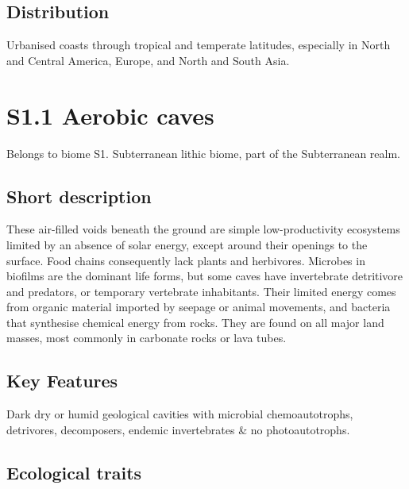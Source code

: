 \documentclass[
  letterpaper,
  DIV=11,
  numbers=noendperiod]{scrartcl}
\begin{document}
\subsection{Distribution}\label{distribution-58}

Urbanised coasts through tropical and temperate latitudes, especially in
North and Central America, Europe, and North and South Asia.

\section{S1.1 Aerobic caves}\label{s1.1-aerobic-caves}

Belongs to biome S1. Subterranean lithic biome, part of the Subterranean
realm.

\subsection{Short description}\label{short-description-59}

These air-filled voids beneath the ground are simple low-productivity
ecosystems limited by an absence of solar energy, except around their
openings to the surface. Food chains consequently lack plants and
herbivores. Microbes in biofilms are the dominant life forms, but some
caves have invertebrate detritivore and predators, or temporary
vertebrate inhabitants. Their limited energy comes from organic material
imported by seepage or animal movements, and bacteria that synthesise
chemical energy from rocks. They are found on all major land masses,
most commonly in carbonate rocks or lava tubes.

\subsection{Key Features}\label{key-features-59}

Dark dry or humid geological cavities with microbial chemoautotrophs,
detrivores, decomposers, endemic invertebrates \& no photoautotrophs.

\subsection{Ecological traits}\label{ecological-traits-59}
\end{document}
